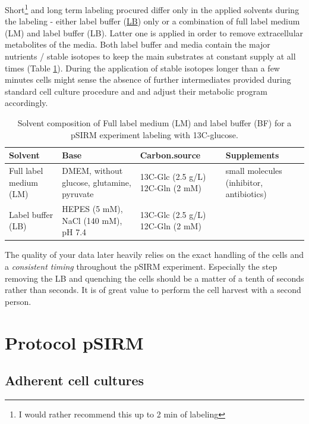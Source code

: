 \documentclass[]{book}
\let\rmarkdownfootnote\footnote%
\def\footnote{\protect\rmarkdownfootnote}
\begin{document}
Short\footnote{I would rather recommend this up to 2 min of labeling}
and long term labeling procured differ only in the applied solvents
during the labeling - either label buffer
(\protect\hyperlink{washingbuffer}{LB}) only or a combination of full
label medium (LM) and label buffer (LB). Latter one is applied in order
to remove extracellular metabolites of the media. Both label buffer and
media contain the major nutrients / stable isotopes to keep the main
substrates at constant supply at all times (Table \ref{tab:solvent}).
During the application of stable isotopes longer than a few minutes
cells might sense the absence of further intermediates provided during
standard cell culture procedure and and adjust their metabolic program
accordingly.

\begin{table}[t]

\caption{\label{tab:solvent}Solvent composition of Full label medium (LM) and label buffer (BF) for a pSIRM experiment labeling with 13C-glucose.}
\centering
\begin{tabular}{llll}
\toprule
Solvent & Base & Carbon.source & Supplements\\
\midrule
Full label medium (LM) & DMEM, without glucose, glutamine, pyruvate & 13C-Glc (2.5 g/L)
12C-Gln (2 mM) & small molecules 
(inhibitor, antibiotics)\\
Label buffer (LB) & HEPES (5 mM), NaCl (140 mM), pH 7.4 & 13C-Glc (2.5 g/L)
12C-Gln (2 mM) & \\
\bottomrule
\end{tabular}
\end{table}

The quality of your data later heavily relies on the exact handling of
the cells and a \emph{consistent timing} throughout the pSIRM
experiment. Especially the step removing the LB and quenching the cells
should be a matter of a tenth of seconds rather than seconds. It is of
great value to perform the cell harvest with a second person.

\section{Protocol pSIRM}\label{protocol-psirm}

\hypertarget{psirm:adherent}{\subsection{Adherent cell
cultures}\label{psirm:adherent}}
\end{document}
